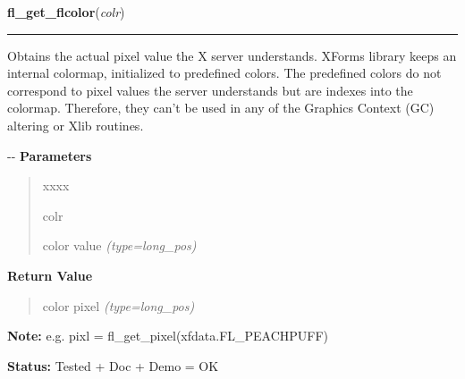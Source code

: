 \hspace{.8\funcindent}\begin{boxedminipage}{\funcwidth}

    \raggedright \textbf{fl\_get\_flcolor}(\textit{colr})

    \vspace{-1.5ex}

    \rule{\textwidth}{0.5\fboxrule}
\setlength{\parskip}{2ex}

Obtains the actual pixel value the X server understands. XForms library
keeps an internal colormap, initialized to predefined colors. The
predefined colors do not correspond to pixel values the server understands
but are indexes into the colormap. Therefore, they can't be used in any of
the Graphics Context (GC) altering or Xlib routines.

-{}-
\setlength{\parskip}{1ex}
      \textbf{Parameters}
      \vspace{-1ex}

      \begin{quote}
        \begin{Ventry}{xxxx}

          \item[colr]


color value
            {\it (type=long\_pos)}

        \end{Ventry}

      \end{quote}

      \textbf{Return Value}
    \vspace{-1ex}

      \begin{quote}

color pixel
      {\it (type=long\_pos)}

      \end{quote}

\textbf{Note:} 
e.g. pixl = fl\_get\_pixel(xfdata.FL\_PEACHPUFF)


\textbf{Status:} 
Tested + Doc + Demo = OK


    \end{boxedminipage}

    \label{xformslib:flbasic:fl_get_icm_color}

    \vspace{0.5ex}

